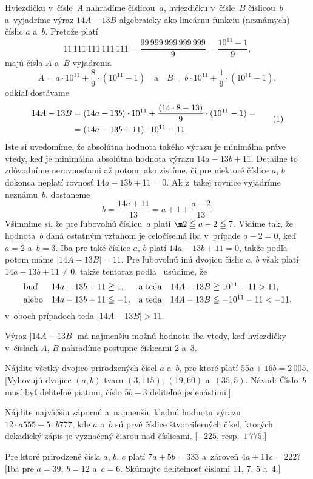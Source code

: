 {%
Hviezdičku v~čísle~$A$ nahradíme číslicou~$a$, hviezdičku v~čísle~$B$
číslicou~$b$ a~vyjadríme výraz $14A-13B$ algebraicky ako
lineárnu funkciu (neznámych) číslic $a$ a~$b$. Pretože platí
$$
11\,111\,111\,111\,111=\frac{99\,999\,999\,999\,999}{9}
=\frac{10^{11}-1}{9},
$$
majú čísla $A$ a~$B$ vyjadrenia
$$
A=a\cdot10^{11}+\frac89\cdot(10^{11}-1)\quad\text{a}\quad
B=b\cdot10^{11}+\frac19\cdot(10^{11}-1),
$$
odkiaľ dostávame
$$
\aligned
14A-13B&=(14a-13b)\cdot10^{11}+\frac{(14\cdot8-13)}{9}\cdot
          (10^{11}-1)=\\
       &=(14a-13b+11)\cdot10^{11}-11.
\endaligned                                  \tag{1}
$$
Iste si uvedomíme, že absolútna hodnota takého výrazu
je minimálna práve vtedy, keď je minimálna absolútna hodnota výrazu
$14a-13b+11$. Detailne to zdôvodníme nerovnosťami až potom, ako
zistíme, či pre niektoré číslice $a$, $b$ dokonca neplatí rovnosť
$14a-13b+11=0$. Ak z~takej rovnice vyjadríme neznámu~$b$, dostaneme 
$$
b=\frac{14a+11}{13}=a+1+\frac{a-2}{13}.
$$
Všimnime si, že pre ľubovoľnú číslicu~$a$ platí ${\m2}\leqq
a-2\leqq7$. Vidíme tak, že hodnota~$b$ daná ostatným vzťahom je
celočíselná iba v~prípade $a-2=0$, keď $a=2$ a~$b=3$. Iba
pre také číslice $a$, $b$ platí $14a-13b+11=0$, takže podľa~
potom máme $|14A-13B|=11$. Pre ľubovoľnú inú dvojicu číslic
$a$, $b$ však platí $14a-13b+11\ne0$, takže tentoraz podľa~
usúdime, že
$$
\openup\jot\let\\=\cr
\vbox{\halign{&\hfil$#$&${}#$\hfil\cr
&\text{buď} &\quad 14a-13b+11&\geqq1,  &\quad &\text{a teda}&\quad
                                       14A-13B&\geqq10^{11}-11>11,\\
&\text{alebo}&\quad 14a-13b+11&\leqq-1, &\quad &\text{a teda}&\quad
                                       14A-13B&\leqq-10^{11}-11<-11,
\cr}}
$$
v~oboch prípadoch teda $|14A-13B|>11$.

\odpoved
Výraz $|14A-13B|$ má najmenšiu možnú hodnotu
iba vtedy, keď hviezdičky v~číslach $A$, $B$ nahradíme postupne
číslicami 2 a~3.

Nájdite všetky dvojice prirodzených čísel $a$ a~$b$, pre ktoré
platí $55a+16b=2\,005$. [Vyhovujú dvojice $(a,b)$ tvaru $(3,115)$,
$(19,60)$ a~$(35,5)$. Návod: Číslo~$b$ musí byť deliteľné piatimi,
číslo $5b-3$ deliteľné jedenástimi.]

Nájdite najväčšiu zápornú a~najmenšiu kladnú hodnotu výrazu
$12\cdot\overline{a555}-5\cdot\overline{b777}$, kde $a$ a~$b$
sú prvé číslice štvorciferných čísel, ktorých dekadický zápis je
vyznačený čiarou nad číslicami. [${-225}$, resp.~$1\,775$.]

Pre ktoré prirodzené čísla $a$, $b$, $c$ platí $7a+5b=333$ a~zároveň
$4a+11c=222$? [Iba pre $a=39$, $b=12$ a~$c=6$. Skúmajte deliteľnosť
číslami 11, 7, 5 a~4.]
}

